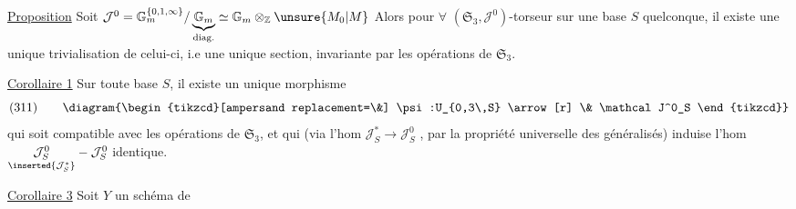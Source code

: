 

\uline{Proposition} Soit 
$\mathcal J^0=\mathbb G_m^{\{0,1,\infty\}}/\underbrace{\mathbb G_m}_{\mathrm{diag.}}\simeq\mathbb G_m\otimes_{\mathbb Z}\unsure{M_0|M}$
Alors pour $\forall$ $(\mathfrak S_3,\mathcal J^0)$-torseur sur une base $S$ quelconque, il existe une unique trivialisation de celui-ci, i.e une unique section, invariante par les opérations de $\mathfrak S_3$.

\uline{Corollaire 1} Sur toute base $S$, il existe un unique morphisme
\[
(311)\qquad
\diagram{\begin{tikzcd}[ampersand replacement=\&]
\psi:U_{0,3\,S} \arrow[r] \& \mathcal J^0_S
\end{tikzcd}}
\]
qui soit compatible avec les opérations de $\mathfrak S_3$, et qui (via l'hom
$\mathcal J^*_S\longrightarrow\mathcal J^0_S$   , par la propriété universelle des  généralisés) induise l'hom
$\underset{\inserted{\mathcal J^*_S}}{\mathcal J^0_S}-\mathcal J^0_S$ identique.


\uline{Corollaire 3} Soit $Y$ un schéma de



